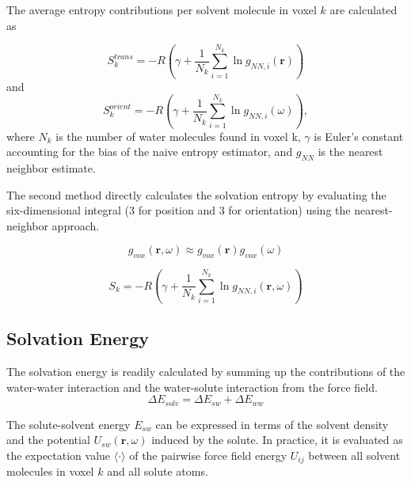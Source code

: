 \documentclass[9pt,tutorial]{livecoms}
\begin{document}
The average entropy contributions per solvent molecule in voxel $k$ are calculated as

\begin{equation}
	S_{k}^\textit{trans} = -R \left( \gamma + \frac{1}{N_\textit{k}} \sum _{i=1}^{N_k} \ln g_{NN, \textit{i}}(\textbf{r}) \right)
\end{equation}
and
\begin{equation}
	S_{k}^\textit{orient} = -R \left( \gamma + \frac{1}{N_k} \sum _{i=1}^{N_k} \ln g_{NN, i}(\omega) \right)
	,
\end{equation}
where $N_\textit{k}$ is the number of water molecules found in voxel k, $\gamma$ is Euler's constant accounting for the bias of the naive entropy estimator, and $g_\textit{NN}$ is the nearest neighbor estimate.

The second method directly calculates the solvation entropy by evaluating the six-dimensional integral (3 for position and 3 for orientation) 
using the nearest-neighbor approach. 

\begin{equation}
g_\textit{vox} \left( \textbf{r}, \omega \right) \approx g_\textit{vox}(\textbf{r}) g_\textit{vox}(\omega)
\end{equation}

\begin{equation}
	S_\textit{k} = -R \left( \gamma + \frac{1}{N_\textit{k}} \sum _{i=1}^{N_k} \ln g_{NN, \textit{i}}(\textbf{r},\omega) \right)
\end{equation}


\subsection{Solvation Energy}
The solvation energy is readily calculated by summing up the contributions of the water-water interaction and the water-solute interaction from the force field.
\begin{equation}
	\Delta E_\textit{solv} = \Delta E_\textit{sw} + \Delta E_\textit{ww}
\end{equation}

The solute-solvent energy $E_{sw}$ can be expressed in terms of the solvent density and the potential $U_{sw}(\textbf{r},\omega)$ induced by the solute.
In practice, it is evaluated as the expectation value $\langle\cdot\rangle$ of the pairwise force field energy $U_{ij}$ between all solvent molecules in voxel $k$ and all solute atoms.
\end{document}
